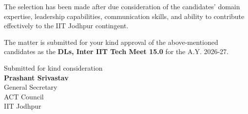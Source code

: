 \documentclass[11pt,letterpaper]{article}
\newcommand{\GSname}{Prashant Srivastav}
\begin{document}
The selection has been made after due consideration of the candidates' domain expertise, leadership capabilities, communication skills, and ability to contribute effectively to the IIT Jodhpur contingent.

The matter is submitted for your kind approval of the above-mentioned candidates as the \textbf{DLs, Inter IIT Tech Meet 15.0} for the A.Y. 2026-27.


\enlargethispage{\baselineskip}
\begin{flushright}
  {\small Submitted for kind consideration}\\[0.5cm]
  {\large\bfseries \GSname}\\
  General Secretary\\
  ACT Council\\
  IIT Jodhpur
\end{flushright}
\end{document}
